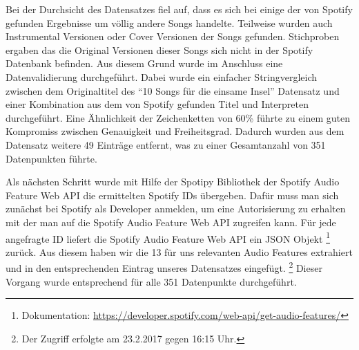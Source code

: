 Bei der Durchsicht des Datensatzes fiel auf, dass es sich bei einige der von Spotify gefunden Ergebnisse um völlig andere Songs handelte.
Teilweise wurden auch Instrumental Versionen oder Cover Versionen der Songs gefunden.
Stichproben ergaben das die Original Versionen dieser Songs sich nicht in der Spotify Datenbank befinden.
Aus diesem Grund wurde im Anschluss eine Datenvalidierung durchgeführt.
Dabei wurde ein einfacher Stringvergleich zwischen dem Originaltitel des "`10 Songs für die einsame Insel"' Datensatz und einer Kombination aus dem von Spotify gefunden Titel und Interpreten durchgeführt.
Eine Ähnlichkeit der Zeichenketten von 60\% führte zu einem guten Kompromiss zwischen Genauigkeit und Freiheitsgrad.
Dadurch wurden aus dem Datensatz weitere 49 Einträge entfernt, was zu einer Gesamtanzahl von 351 Datenpunkten führte.

Als nächsten Schritt wurde mit Hilfe der Spotipy Bibliothek der Spotify Audio Feature Web API die ermittelten Spotify IDs übergeben.
Dafür muss man sich zunächst bei Spotify als Developer anmelden, um eine Autorisierung zu erhalten mit der man auf die Spotify Audio Feature Web API zugreifen kann.
Für jede angefragte ID liefert die Spotify Audio Feature Web API ein JSON Objekt \footnote{Dokumentation: \url{https://developer.spotify.com/web-api/get-audio-features/}} zurück.
Aus diesem haben wir die 13 für uns relevanten Audio Features extrahiert und in den entsprechenden Eintrag unseres Datensatzes eingefügt.
\footnote{Der Zugriff erfolgte am 23.2.2017 gegen 16:15 Uhr.}
Dieser Vorgang wurde entsprechend für alle 351 Datenpunkte durchgeführt.

